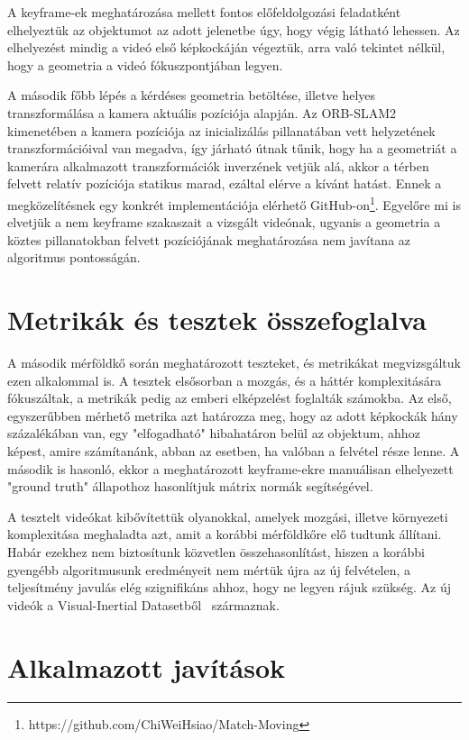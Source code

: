 A keyframe-ek meghatározása mellett fontos előfeldolgozási feladatként elhelyeztük az objektumot az adott jelenetbe úgy, hogy végig látható lehessen.
Az elhelyezést mindig a videó első képkockáján végeztük, arra való tekintet nélkül, hogy a geometria a videó fókuszpontjában legyen.

A második főbb lépés a kérdéses geometria betöltése, illetve helyes transzformálása a kamera aktuális pozíciója alapján.
Az ORB-SLAM2 kimenetében a kamera pozíciója az inicializálás pillanatában vett helyzetének transzformációival van megadva, így járható útnak tűnik, hogy ha a geometriát a kamerára alkalmazott transzformációk inverzének vetjük alá, akkor a térben felvett relatív pozíciója statikus marad, ezáltal elérve a kívánt hatást.
Ennek a megközelítésnek egy konkrét implementációja elérhető GitHub-on\footnote{https://github.com/ChiWeiHsiao/Match-Moving}.
Egyelőre mi is elvetjük a nem keyframe szakaszait a vizsgált videónak, ugyanis a geometria a köztes pillanatokban felvett pozíciójának meghatározása nem javítana az algoritmus pontosságán.


\section{Metrikák és tesztek összefoglalva}

A második mérföldkő során meghatározott teszteket, és metrikákat megvizsgáltuk ezen alkalommal is.
A tesztek elsősorban a mozgás, és a háttér komplexitására fókuszáltak, a metrikák pedig az emberi elképzelést foglalták számokba.
Az első, egyszerűbben mérhető metrika azt határozza meg, hogy az adott képkockák hány százalékában van, egy "elfogadható" hibahatáron belül az objektum, ahhoz képest, amire számítanánk, abban az esetben, ha valóban a felvétel része lenne.
A második is hasonló, ekkor a meghatározott keyframe-ekre manuálisan elhelyezett "ground truth" állapothoz hasonlítjuk mátrix normák segítségével.

A tesztelt videókat kibővítettük olyanokkal, amelyek mozgási, illetve környezeti komplexitása meghaladta azt, amit a korábbi mérföldkőre elő tudtunk állítani.
Habár ezekhez nem biztosítunk közvetlen összehasonlítást, hiszen a korábbi gyengébb algoritmusunk eredményeit nem mértük újra az új felvételen, a teljesítmény javulás elég szignifikáns ahhoz, hogy ne legyen rájuk szükség.
Az új videók a Visual-Inertial Datasetből~\cite{klenk2021tum} származnak.

\section{Alkalmazott javítások}

